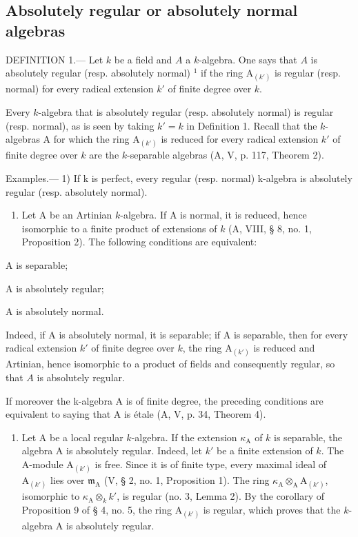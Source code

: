 \subsection{Absolutely regular or absolutely normal algebras}

DEFINITION 1.--- Let \(k\) be a field and \(A\) a \(k\)-algebra. One says that \(A\) is absolutely regular (resp. absolutely normal) \(^{1}\) if the ring \(\mathrm{A}_{(k')}\) is regular (resp. normal) for every radical extension \(k'\) of finite degree over \(k\).

Every \(k\)-algebra that is absolutely regular (resp. absolutely normal) is regular (resp. normal), as is seen by taking \(k' = k\) in Definition 1. Recall that the \(k\)-algebras A for which the ring \(\mathrm{A}_{(k')}\) is reduced for every radical extension \(k'\) of finite degree over \(k\) are the \(k\)-separable algebras (A, V, p. 117, Theorem 2).

Examples.--- 1) If k is perfect, every regular (resp. normal) k-algebra is absolutely regular (resp. absolutely normal).

\begin{enumerate}
\def\labelenumi{\arabic{enumi})}
\setcounter{enumi}{1}
\tightlist
\item
  Let A be an Artinian \(k\)-algebra. If A is normal, it is reduced, hence isomorphic to a finite product of extensions of \(k\) (A, VIII, § 8, no. 1, Proposition 2). The following conditions are equivalent:
\end{enumerate}

A is separable;

A is absolutely regular;

A is absolutely normal.

Indeed, if A is absolutely normal, it is separable; if A is separable, then for every radical extension \(k'\) of finite degree over \(k\), the ring \(\mathrm{A}_{(k')}\) is reduced and Artinian, hence isomorphic to a product of fields and consequently regular, so that \(A\) is absolutely regular.

If moreover the k-algebra A is of finite degree, the preceding conditions are equivalent to saying that A is étale (A, V, p. 34, Theorem 4).

\begin{enumerate}
\def\labelenumi{\arabic{enumi})}
\setcounter{enumi}{2}
\tightlist
\item
  Let A be a local regular \(k\)-algebra. If the extension \(\kappa_{\mathrm{A}}\) of \(k\) is separable, the algebra A is absolutely regular. Indeed, let \(k'\) be a finite extension of \(k\). The A-module \(\mathrm{A}_{(k')}\) is free. Since it is of finite type, every maximal ideal of \(\mathrm{A}_{(k')}\) lies over \(\mathfrak{m}_{\mathrm{A}}\) (V, § 2, no. 1, Proposition 1). The ring \(\kappa_{\mathrm{A}} \otimes_{\mathrm{A}} \mathrm{A}_{(k')}\), isomorphic to \(\kappa_{\mathrm{A}} \otimes_{k} k'\), is regular (no. 3, Lemma 2). By the corollary of Proposition 9 of § 4, no. 5, the ring \(\mathrm{A}_{(k')}\) is regular, which proves that the \(k\)-algebra A is absolutely regular.
\end{enumerate}

